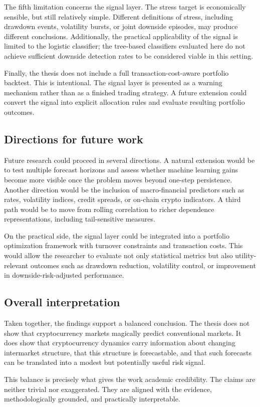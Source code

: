 The fifth limitation concerns the signal layer. The stress target is economically sensible, but still relatively simple. Different definitions of stress, including drawdown events, volatility bursts, or joint downside episodes, may produce different conclusions. Additionally, the practical applicability of the signal is limited to the logistic classifier; the tree-based classifiers evaluated here do not achieve sufficient downside detection rates to be considered viable in this setting.

Finally, the thesis does not include a full transaction-cost-aware portfolio backtest. This is intentional. The signal layer is presented as a warning mechanism rather than as a finished trading strategy. A future extension could convert the signal into explicit allocation rules and evaluate resulting portfolio outcomes.

\subsection{Directions for future work}

Future research could proceed in several directions. A natural extension would be to test multiple forecast horizons and assess whether machine learning gains become more visible once the problem moves beyond one-step persistence. Another direction would be the inclusion of macro-financial predictors such as rates, volatility indices, credit spreads, or on-chain crypto indicators. A third path would be to move from rolling correlation to richer dependence representations, including tail-sensitive measures.

On the practical side, the signal layer could be integrated into a portfolio optimization framework with turnover constraints and transaction costs. This would allow the researcher to evaluate not only statistical metrics but also utility-relevant outcomes such as drawdown reduction, volatility control, or improvement in downside-risk-adjusted performance.

\subsection{Overall interpretation}

Taken together, the findings support a balanced conclusion. The thesis does not show that cryptocurrency markets magically predict conventional markets. It does show that cryptocurrency dynamics carry information about changing intermarket structure, that this structure is forecastable, and that such forecasts can be translated into a modest but potentially useful risk signal.

This balance is precisely what gives the work academic credibility. The claims are neither trivial nor exaggerated. They are aligned with the evidence, methodologically grounded, and practically interpretable.
